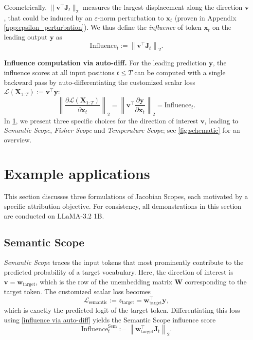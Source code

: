 \documentclass{article}
\begin{document}
Geometrically, $\lVert \bm{v}^\intercal \bm{J}_t \rVert_2$ measures the largest displacement 
along the direction $\bm{v}$, 
that could be induced by an $\varepsilon$-norm perturbation to \(\bm{x}_t\) (proven in Appendix \ref{app:epsilon_perturbation}).
We thus define the \emph{influence} of token \(\bm{x}_t\) on the leading output \(\bm{y}\) as
\begin{equation}
\mathrm{Influence}_t := \left\lVert \bm{v}^\intercal \bm{J}_t \right\rVert_2.
\label{def:influence}
\end{equation}


\noindent
\textbf{Influence computation via auto-diff.} 
For the leading prediction \(\bm{y}\), 
the influence scores at all input positions \(t \le T\) can be computed with a single backward pass by auto-differentiating the customized scalar loss
$\mathcal{L}(\bm{X}_{1:T}) := \bm{v}^\intercal \bm{y}$:
\begin{equation}\label{influence via auto-diff}
  \left\lVert \frac{\partial \mathcal{L}(\bm{X}_{1:T}) }{\partial \bm{x}_t} \right\rVert_2
    = \left\|\bm{v}^\intercal \frac{\partial \bm{y}}{\partial \bm{x}_t}\right\|_2= \mathrm{Influence}_t.
\end{equation}
In \cref{sec:applications}, we present three specific choices for the direction of interest $\bm{v}$, leading to \emph{Semantic Scope}, \emph{Fisher Scope} and \emph{Temperature Scope}; see \cref{fig:schematic} for an overview. 

\section{Example applications}
\label{sec:applications}
This section discusses three formulations of Jacobian Scopes, each motivated by a specific attribution objective.
For consistency, all demonstrations in this section are conducted on LLaMA-3.2 1B.

\subsection{Semantic Scope}
\label{sec:Semantic Scope}


\textit{Semantic Scope} traces the input tokens that most prominently contribute to the predicted probability of a target vocabulary. Here, the direction of interest is $\bm{v}=\bm{w}_\mathrm{target}$, which is the row of the unembedding matrix $\bm{W}$ corresponding to the target token. The customized scalar loss becomes
\begin{equation}
  \mathcal{L}_\mathrm{semantic}:= z_\mathrm{target} = \bm{w}_\mathrm{target}^\intercal \bm{y},
\end{equation}
which is exactly the predicted logit of the target token. 
Differentiating this loss using \cref{influence via auto-diff} yields the Semantic Scope influence score
\begin{equation}
  \mathrm{Influence}_t^{\mathrm{Sem}} := \left\|\bm{w}_\mathrm{target}^\intercal \bm{J}_t\right\|_{2}.
\end{equation}
\end{document}
